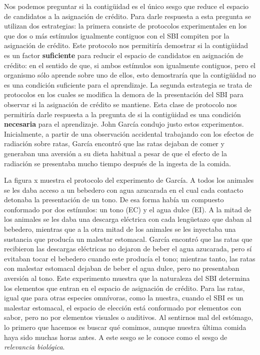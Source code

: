 \documentclass[
  letterpaper,
]{book}
\begin{document}
Nos podemos preguntar si la contigüidad es el único sesgo que reduce el
espacio de candidatos a la asignación de crédito. Para darle respuesta a
esta pregunta se utilizan dos estrategias: la primera consiste de
protocolos experimentales en los que dos o más estímulos igualmente
contiguos con el SBI compiten por la asignación de crédito. Este
protocolo nos permitiría demostrar si la contigüidad es un factor
\textbf{suficiente} para reducir el espacio de candidatos en asignación
de crédito: en el sentido de que, si ambos estímulos son igualmente
contiguos, pero el organismo sólo aprende sobre uno de ellos, esto
demostraría que la contigüidad no es una condición suficiente para el
aprendizaje. La segunda estrategia se trata de protocolos en los cuales
se modifica la demora de la presentación del SBI para observar si la
asignación de crédito se mantiene. Esta clase de protocolo nos
permitiría darle respuesta a la pregunta de si la contigüidad es una
condición \textbf{necesaria} para el aprendizaje. John García condujo
justo estos experimentos. Inicialmente, a partir de una observación
accidental trabajando con los efectos de radiación sobre ratas, García
encontró que las ratas dejaban de comer y generaban una aversión a su
dieta habitual a pesar de que el efecto de la radiación se presentaba
mucho tiempo después de la ingesta de la comida.

La figura x muestra el protocolo del experimento de García. A todos los
animales se les daba acceso a un bebedero con agua azucarada en el cual
cada contacto detonaba la presentación de un tono. De esa forma había un
compuesto conformado por dos estímulos: un tono (EC) y el agua dulce
(EI). A la mitad de los animales se les daba una descarga eléctrica con
cada lengüetazo que daban al bebedero, mientras que a la otra mitad de
los animales se les inyectaba una sustancia que producía un malestar
estomacal. García encontró que las ratas que recibieron las descargas
eléctricas no dejaron de beber el agua azucarada, pero sí evitaban tocar
el bebedero cuando este producía el tono; mientras tanto, las ratas con
malestar estomacal dejaban de beber el agua dulce, pero no presentaban
aversión al tono. Este experimento muestra que la naturaleza del SBI
determina los elementos que entran en el espacio de asignación de
crédito. Para las ratas, igual que para otras especies omnívoras, como
la nuestra, cuando el SBI es un malestar estomacal, el espacio de
elección está conformado por elementos con sabor, pero no por elementos
visuales o auditivos. Al sentirnos mal del estómago, lo primero que
hacemos es buscar qué comimos, aunque nuestra última comida haya sido
muchas horas antes. A este sesgo se le conoce como el sesgo de
\emph{relevancia biológica}.
\end{document}
